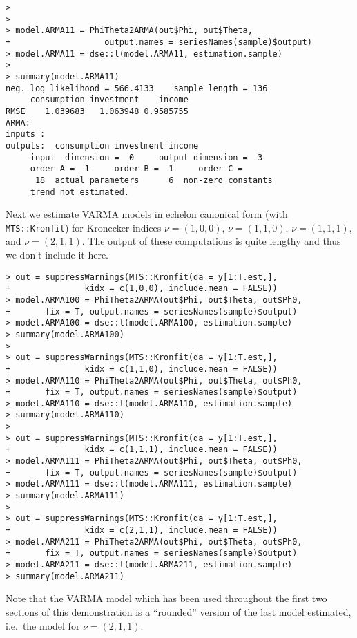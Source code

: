 \documentclass[]{article}
\begin{document}
\begin{verbatim}
> 
> 
> model.ARMA11 = PhiTheta2ARMA(out$Phi, out$Theta, 
+                   output.names = seriesNames(sample)$output) 
> model.ARMA11 = dse::l(model.ARMA11, estimation.sample)
> 
> summary(model.ARMA11)
neg. log likelihood = 566.4133    sample length = 136 
     consumption investment    income
RMSE    1.039683   1.063948 0.9585755
ARMA:  
inputs :  
outputs:  consumption investment income 
     input  dimension =  0     output dimension =  3 
     order A =  1     order B =  1     order C =   
      18  actual parameters      6  non-zero constants
     trend not estimated.
\end{verbatim}

Next we estimate VARMA models in echelon canonical form (with
\texttt{MTS::Kronfit}) for Kronecker indices \(\nu=(1,0,0)\),
\(\nu=(1,1,0)\), \(\nu=(1,1,1)\), and \(\nu=(2,1,1)\). The output of
these computations is quite lengthy and thus we don't include it here.

\begin{verbatim}
> out = suppressWarnings(MTS::Kronfit(da = y[1:T.est,], 
+               kidx = c(1,0,0), include.mean = FALSE))
> model.ARMA100 = PhiTheta2ARMA(out$Phi, out$Theta, out$Ph0, 
+       fix = T, output.names = seriesNames(sample)$output)
> model.ARMA100 = dse::l(model.ARMA100, estimation.sample)
> summary(model.ARMA100)
> 
> out = suppressWarnings(MTS::Kronfit(da = y[1:T.est,], 
+               kidx = c(1,1,0), include.mean = FALSE))
> model.ARMA110 = PhiTheta2ARMA(out$Phi, out$Theta, out$Ph0, 
+       fix = T, output.names = seriesNames(sample)$output)
> model.ARMA110 = dse::l(model.ARMA110, estimation.sample)
> summary(model.ARMA110)
> 
> out = suppressWarnings(MTS::Kronfit(da = y[1:T.est,], 
+               kidx = c(1,1,1), include.mean = FALSE))
> model.ARMA111 = PhiTheta2ARMA(out$Phi, out$Theta, out$Ph0, 
+       fix = T, output.names = seriesNames(sample)$output)
> model.ARMA111 = dse::l(model.ARMA111, estimation.sample)
> summary(model.ARMA111)
> 
> out = suppressWarnings(MTS::Kronfit(da = y[1:T.est,], 
+               kidx = c(2,1,1), include.mean = FALSE))
> model.ARMA211 = PhiTheta2ARMA(out$Phi, out$Theta, out$Ph0, 
+       fix = T, output.names = seriesNames(sample)$output)
> model.ARMA211 = dse::l(model.ARMA211, estimation.sample)
> summary(model.ARMA211)
\end{verbatim}

Note that the VARMA model which has been used throughout the first two
sections of this demonstration is a ``rounded'' version of the last
model estimated, i.e.~the model for \(\nu = (2,1,1)\).
\end{document}
